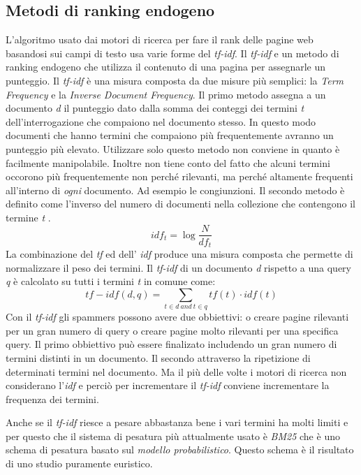\subsection{Metodi di ranking endogeno}
L'algoritmo usato dai motori di ricerca per fare il rank delle pagine web basandosi sui campi di testo usa varie forme del \textit{tf-idf}. Il \textit{tf-idf} e un metodo di ranking endogeno che utilizza il contenuto di una pagina per assegnarle un punteggio. Il \textit{tf-idf} è una misura composta da due misure più semplici: la \textit{Term Frequency} e la \textit{Inverse Document Frequency}. Il primo metodo assegna a un documento \textit{d} il punteggio dato dalla somma dei conteggi dei termini \textit{t} dell'interrogazione che compaiono nel documento stesso. In questo modo documenti che hanno termini che compaiono più frequentemente avranno un punteggio più elevato. Utilizzare solo questo metodo non conviene in quanto è facilmente manipolabile. Inoltre non tiene conto del fatto che alcuni termini occorono più frequentemente non perché rilevanti, ma perché altamente frequenti all'interno di \textit{ogni} documento. Ad esempio le congiunzioni. Il secondo metodo è definito come l'inverso del numero di 
documenti nella collezione che contengono il termine \textit{t} \cite{Manning:2008:IIR:1394399p117}.
\begin{equation}
 idf_t=\log\frac{N}{df_t}
 \label{eq:idf}
\end{equation}
La combinazione del \textit{tf} ed dell' \textit{idf} produce una misura composta che permette di normalizzare il peso dei termini. Il \textit{tf-idf} di un documento \textit{d} rispetto a una query \textit{q} è calcolato su tutti i termini \textit{t} in comune come:
\begin{equation}
 tf-idf(d,q)=\sum_{t \in d \: and \: t \in q} tf(t) \cdot idf(t)
\end{equation}
Con il \textit{tf-idf} gli spammers possono avere due obbiettivi: o creare pagine rilevanti per un gran numero di query o creare pagine molto rilevanti per una specifica query. Il primo obbiettivo può essere finalizato includendo un gran numero di termini distinti in un documento. Il secondo attraverso la ripetizione di determinati termini nel documento. Ma il più delle volte i motori di ricerca non considerano l'\textit{idf} e perciò per incrementare il \textit{tf-idf} conviene incrementare la frequenza dei termini.

Anche se il \textit{tf-idf} riesce a pesare abbastanza bene i vari termini ha molti limiti e per questo che il sistema di pesatura più attualmente usato è \textit{BM25} \cite{Robertson:2009:PRF:1704809.1704810} che è uno schema di pesatura basato sul \textit{modello probabilistico}. Questo schema è il risultato di uno studio puramente euristico.


